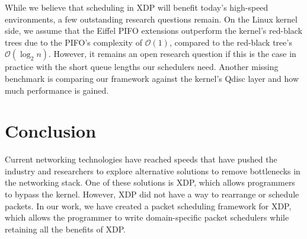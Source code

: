 \documentclass[sigconf, nonacm]{acmart}
\begin{document}
While we believe that scheduling in XDP will benefit today's high-speed environments, a few outstanding research questions remain. On the Linux kernel side, we assume that the Eiffel PIFO extensions outperform the kernel's red-black trees due to the PIFO's complexity of $\mathcal{O}(1)$, compared to the red-black tree's $\mathcal{O}(\log_{2}{}n)$. However, it remains an open research question if this is the case in practice with the short queue lengths our schedulers need. Another missing benchmark is comparing our framework against the kernel's Qdisc layer and how much performance is gained.


\section{Conclusion}

Current networking technologies have reached speeds that have pushed the industry and researchers to explore alternative solutions to remove bottlenecks in the networking stack. One of these solutions is XDP, which allows programmers to bypass the kernel. However, XDP did not have a way to rearrange or schedule packets. In our work, we have created a packet scheduling framework for XDP, which allows the programmer to write domain-specific packet schedulers while retaining all the benefits of XDP.




\end{document}
